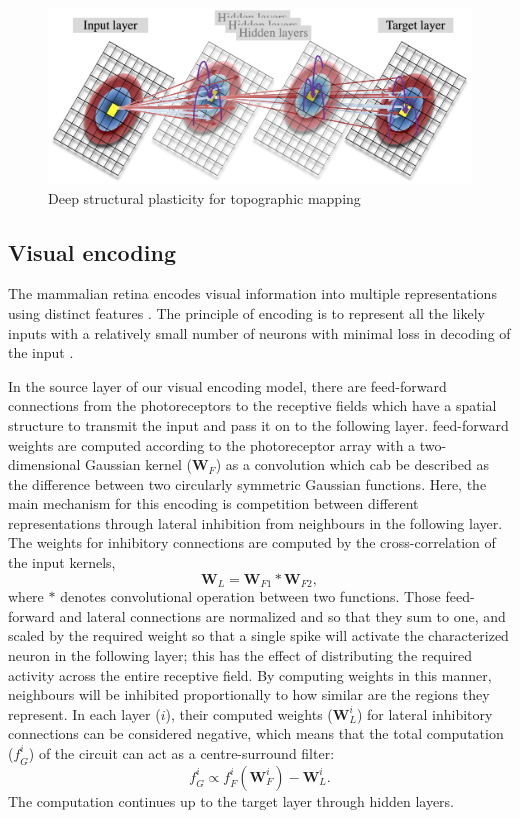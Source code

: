 \documentclass[letterpaper, 10 pt, conference]{ieeeconf}  %
\begin{document}
\begin{figure}[tbh]
    \centering
    \includegraphics[width=0.90\linewidth, trim=0cm 0cm 0cm 0cm, clip=true]{DSP_n}
    \caption{Deep structural plasticity for topographic mapping}
    \label{fig:dsp}
\end{figure}

\subsection{Visual encoding}
The mammalian retina encodes visual information into multiple representations using distinct features \cite{roska2014retina}. The principle of encoding is to represent all the likely inputs with a relatively small number of neurons with minimal loss in decoding of the input \cite{field1994goal}.

In the source layer of our visual encoding model, there are feed-forward connections from the photoreceptors to the receptive fields which have a spatial structure to transmit the input and pass it on to the following layer.
feed-forward weights are computed according to the photoreceptor array with a two-dimensional Gaussian kernel ($\mathbf{W}_F$) as a convolution which cab be described as the difference between two circularly symmetric
Gaussian functions.
Here, the main mechanism for this encoding is competition between different representations through lateral inhibition from neighbours in the following layer.
The weights for inhibitory connections are computed by the cross-correlation of the input kernels,
%
\begin{equation}
    \mathbf{W}_{L}  = \mathbf{W}_{F1} \ast \mathbf{W}_{F2} ,
\end{equation}
%
where $\ast$ denotes convolutional operation between two functions.
Those feed-forward and lateral connections are normalized and so that they sum to one, and scaled by the required weight so that a single spike will activate the characterized neuron in the following layer; 
this has the effect of distributing the required activity across the entire receptive field. 
By computing weights in this manner, neighbours will be inhibited proportionally to how similar are the regions they represent. 
In each layer ($i$), their computed weights ($\mathbf{W}_L^i$) for lateral inhibitory connections can be considered negative, which means that the total computation ($\mathit{f}_G^i$) of the circuit can act as a centre-surround filter:
%
\begin{equation}
    \mathit{f}_G^i  \varpropto \mathit{f}^i_{F}(\mathbf{W}^i_{F}) - \mathbf{W}_{L}^i .
\end{equation}
%
The computation continues up to the target layer through hidden layers.
\end{document}
